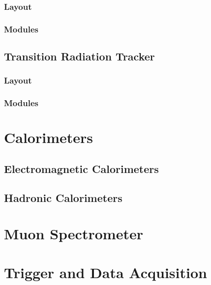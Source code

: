 \subsubsection{Layout}

\subsubsection{Modules}

\subsection{Transition Radiation Tracker}

\subsubsection{Layout}
\subsubsection{Modules}

\section{Calorimeters}
\subsection{Electromagnetic Calorimeters}
\subsection{Hadronic Calorimeters}
\section{Muon Spectrometer}
\section{Trigger and Data Acquisition}